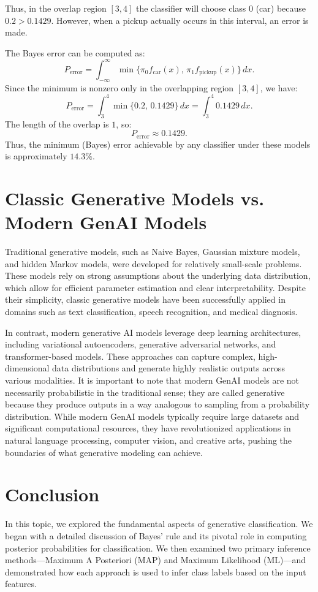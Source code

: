 \documentclass[12pt]{article}
\begin{document}
Thus, in the overlap region \([3,4]\) the classifier will choose class 0 (car) because \(0.2 > 0.1429\). However, when a pickup actually occurs in this interval, an error is made.

The Bayes error can be computed as:
\[
P_{\text{error}} = \int_{-\infty}^{\infty} \min\{\pi_0 f_{\text{car}}(x),\, \pi_1 f_{\text{pickup}}(x)\} \, dx.
\]
Since the minimum is nonzero only in the overlapping region \([3,4]\), we have:
\[
P_{\text{error}} = \int_{3}^{4} \min\{0.2,\, 0.1429\} \, dx = \int_{3}^{4} 0.1429 \, dx.
\]
The length of the overlap is \(1\), so:
\[
P_{\text{error}} \approx 0.1429.
\]
Thus, the minimum (Bayes) error achievable by any classifier under these models is approximately \(14.3\%\).

\section{Classic Generative Models vs. Modern GenAI Models}
Traditional generative models, such as Naive Bayes, Gaussian mixture models, and hidden Markov models, were developed for relatively small-scale problems. These models rely on strong assumptions about the underlying data distribution, which allow for efficient parameter estimation and clear interpretability. Despite their simplicity, classic generative models have been successfully applied in domains such as text classification, speech recognition, and medical diagnosis.

In contrast, modern generative AI models leverage deep learning architectures, including variational autoencoders, generative adversarial networks, and transformer-based models. These approaches can capture complex, high-dimensional data distributions and generate highly realistic outputs across various modalities. It is important to note that modern GenAI models are not necessarily probabilistic in the traditional sense; they are called generative because they produce outputs in a way analogous to sampling from a probability distribution. While modern GenAI models typically require large datasets and significant computational resources, they have revolutionized applications in natural language processing, computer vision, and creative arts, pushing the boundaries of what generative modeling can achieve.

\section{Conclusion}
In this topic, we explored the fundamental aspects of generative classification. We began with a detailed discussion of Bayes' rule and its pivotal role in computing posterior probabilities for classification. We then examined two primary inference methods---Maximum A Posteriori (MAP) and Maximum Likelihood (ML)---and demonstrated how each approach is used to infer class labels based on the input features.
\end{document}
